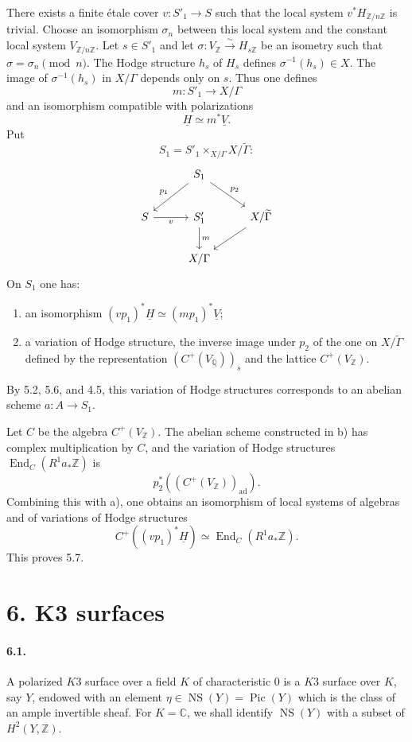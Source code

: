 \documentclass[10pt]{article}
\newcommand{\C}{\mathbb{C}}
\newcommand{\Q}{\mathbb{Q}}
\newcommand{\Z}{\mathbb{Z}}
\newcommand{\Pic}{\operatorname{Pic}}
\newcommand{\End}{\operatorname{End}}
\newcommand{\iso}{\xrightarrow{\sim}}
\providecommand{\NS}{\operatorname{NS}}
\begin{document}
There exists a finite étale cover $v:S'_1\to S$ such that the local system $v^*H_{\Z/n\Z}$ is trivial. Choose an isomorphism $\sigma_n$ between this local system and the constant local system $V_{\Z/n\Z}$. Let $s\in S'_1$ and let $\sigma:V_\Z\iso H_{s\Z}$ be an isometry such that $\sigma=\sigma_n\pmod n$. The Hodge structure $h_s$ of $H_s$ defines $\sigma^{-1}(h_s)\in X$. The image of $\sigma^{-1}(h_s)$ in $X/\Gamma$ depends only on $s$. Thus one defines
\[
m:S'_1\longrightarrow X/\Gamma
\]
and an isomorphism compatible with polarizations
\[
\underline H\simeq m^*\underline V.
\]
Put
\[
S_1=S'_1\times_{X/\Gamma}X/\widetilde\Gamma:
\]
\[
\begin{tikzcd}[column sep=2.7em,row sep=2.0em]
& S_1 \arrow[dl,"p_1"'] \arrow[dr,"p_2"] &\\
S \arrow[r,"v"'] & S'_1 \arrow[d,"m"] & X/\widetilde\Gamma \arrow[dl]\\
& X/\Gamma &
\end{tikzcd}
\]
On $S_1$ one has:
\begin{enumerate}[label=\alph*)]
\item an isomorphism $(vp_1)^*\underline H\simeq (mp_1)^*\underline V$;
\item a variation of Hodge structure, the inverse image under $p_2$ of the one on $X/\widetilde\Gamma$ defined by the representation $(C^+(V_\Q))_s$ and the lattice $C^+(V_\Z)$.
\end{enumerate}
By 5.2, 5.6, and 4.5, this variation of Hodge structures corresponds to an abelian scheme $a:A\to S_1$.

Let $C$ be the algebra $C^+(V_\Z)$. The abelian scheme constructed in b) has complex multiplication by $C$, and the variation of Hodge structures $\End_C(R^1a_*\Z)$ is
\[
p_2^*((C^+(V_\Z))_{\mathrm{ad}}).
\]
Combining this with a), one obtains an isomorphism of local systems of algebras and of variations of Hodge structures
\[
C^+((vp_1)^*\underline H)\simeq \End_C(R^1a_*\Z).
\]
This proves 5.7.

\section*{6. K3 surfaces}

\paragraph{6.1.} A polarized $K3$ surface over a field $K$ of characteristic $0$ is a $K3$ surface over $K$, say $Y$, endowed with an element $\eta\in\NS(Y)=\Pic(Y)$ which is the class of an ample invertible sheaf. For $K=\C$, we shall identify $\NS(Y)$ with a subset of $H^2(Y,\Z)$.
\end{document}
